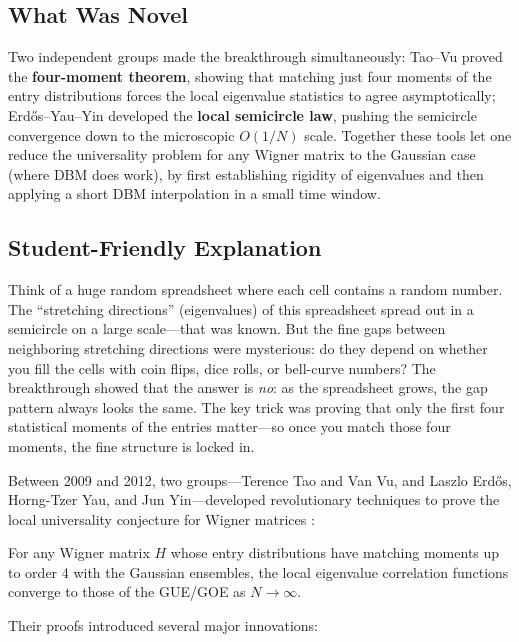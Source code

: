 \subsection{What Was Novel}
Two independent groups made the breakthrough simultaneously: Tao--Vu proved the \textbf{four-moment theorem}, showing that matching just four moments of the entry distributions forces the local eigenvalue statistics to agree asymptotically; Erdős--Yau--Yin developed the \textbf{local semicircle law}, pushing the semicircle convergence down to the microscopic $O(1/N)$ scale. Together these tools let one reduce the universality problem for any Wigner matrix to the Gaussian case (where DBM does work), by first establishing rigidity of eigenvalues and then applying a short DBM interpolation in a small time window.

\subsection{Student-Friendly Explanation}
Think of a huge random spreadsheet where each cell contains a random number. The ``stretching directions'' (eigenvalues) of this spreadsheet spread out in a semicircle on a large scale---that was known. But the fine gaps between neighboring stretching directions were mysterious: do they depend on whether you fill the cells with coin flips, dice rolls, or bell-curve numbers? The breakthrough showed that the answer is \emph{no}: as the spreadsheet grows, the gap pattern always looks the same. The key trick was proving that only the first four statistical moments of the entries matter---so once you match those four moments, the fine structure is locked in.

Between 2009 and 2012, two groups---Terence Tao and Van Vu, and Laszlo Erdős, Horng-Tzer Yau, and Jun Yin---developed revolutionary techniques to prove the local universality conjecture for Wigner matrices \cite{erdos2012, taovu2011}:

\begin{theorem}
For any Wigner matrix $H$ whose entry distributions have matching moments up to order 4 with the Gaussian ensembles, the local eigenvalue correlation functions converge to those of the GUE/GOE as $N \to \infty$.
\end{theorem}

Their proofs introduced several major innovations:


